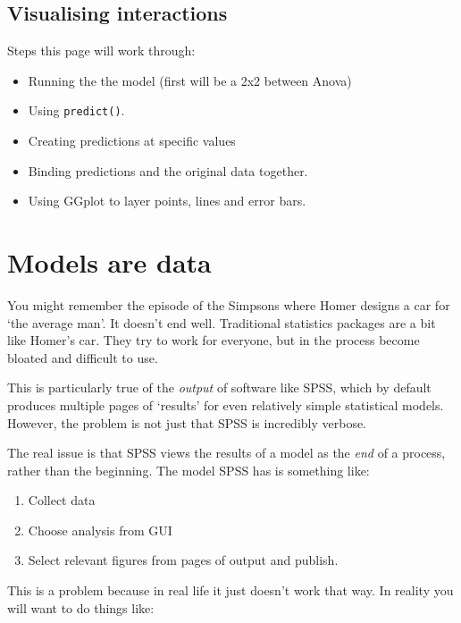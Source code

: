 \documentclass[]{article}
\providecommand{\tightlist}{%
  \setlength{\itemsep}{0pt}\setlength{\parskip}{0pt}}
\theoremstyle{definition}
\theoremstyle{definition}
\theoremstyle{definition}
\theoremstyle{remark}
\begin{document}
\subsection*{Visualising interactions}\label{visualising-interactions}

Steps this page will work through:

\begin{itemize}
\tightlist
\item
  Running the the model (first will be a 2x2 between Anova)
\item
  Using \texttt{predict()}.
\item
  Creating predictions at specific values
\item
  Binding predictions and the original data together.
\item
  Using GGplot to layer points, lines and error bars.
\end{itemize}

\hypertarget{models-are-data-too}{\section{Models are
data}\label{models-are-data-too}}

You might remember the episode of the Simpsons where Homer designs a car
for `the average man'. It doesn't end well. Traditional statistics
packages are a bit like Homer's car. They try to work for everyone, but
in the process become bloated and difficult to use.

This is particularly true of the \emph{output} of software like SPSS,
which by default produces multiple pages of `results' for even
relatively simple statistical models. However, the problem is not just
that SPSS is incredibly verbose.

The real issue is that SPSS views the results of a model as the
\emph{end} of a process, rather than the beginning. The model SPSS has
is something like:

\begin{enumerate}
\def\labelenumi{\arabic{enumi}.}
\tightlist
\item
  Collect data
\item
  Choose analysis from GUI
\item
  Select relevant figures from pages of output and publish.
\end{enumerate}

This is a problem because in real life it just doesn't work that way. In
reality you will want to do things like:
\end{document}
